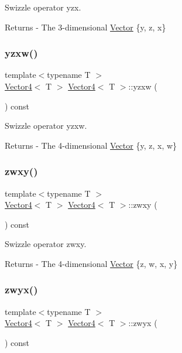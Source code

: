 Swizzle operator yzx. \begin{DoxyReturn}{Returns}
-\/ The 3-\/dimensional \mbox{\hyperlink{class_vector}{Vector}} \{y, z, x\} 
\end{DoxyReturn}
\mbox{\label{class_vector4_a2b21ad926428f4e95d4edf310470087a}} 
\subsubsection{\texorpdfstring{yzxw()}{yzxw()}}
{\footnotesize\ttfamily template$<$typename T $>$ \\
\mbox{\hyperlink{class_vector4}{Vector4}}$<$ T $>$ \mbox{\hyperlink{class_vector4}{Vector4}}$<$ T $>$\+::yzxw (\begin{DoxyParamCaption}{ }\end{DoxyParamCaption}) const}

Swizzle operator yzxw. \begin{DoxyReturn}{Returns}
-\/ The 4-\/dimensional \mbox{\hyperlink{class_vector}{Vector}} \{y, z, x, w\} 
\end{DoxyReturn}
\mbox{\label{class_vector4_a3f285f0892d366a95fc51a525c3716d1}} 
\subsubsection{\texorpdfstring{zwxy()}{zwxy()}}
{\footnotesize\ttfamily template$<$typename T $>$ \\
\mbox{\hyperlink{class_vector4}{Vector4}}$<$ T $>$ \mbox{\hyperlink{class_vector4}{Vector4}}$<$ T $>$\+::zwxy (\begin{DoxyParamCaption}{ }\end{DoxyParamCaption}) const}

Swizzle operator zwxy. \begin{DoxyReturn}{Returns}
-\/ The 4-\/dimensional \mbox{\hyperlink{class_vector}{Vector}} \{z, w, x, y\} 
\end{DoxyReturn}
\mbox{\label{class_vector4_a7b42f77641550057ea5959eddf93a05f}} 
\subsubsection{\texorpdfstring{zwyx()}{zwyx()}}
{\footnotesize\ttfamily template$<$typename T $>$ \\
\mbox{\hyperlink{class_vector4}{Vector4}}$<$ T $>$ \mbox{\hyperlink{class_vector4}{Vector4}}$<$ T $>$\+::zwyx (\begin{DoxyParamCaption}{ }\end{DoxyParamCaption}) const}

